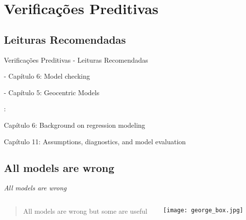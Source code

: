 \section{Verificações Preditivas}

\subsection{Leituras Recomendadas}
\begin{frame}{Verificações Preditivas - Leituras Recomendadas}
	\begin{vfilleditems}
		\item \textcite{gelman2013bayesian} - Capítulo 6: Model checking
		\item \textcite{mcelreath2020statistical} - Capítulo 5: Geocentric Models
		\item \textcite{gelman2020regression}:
		\begin{vfilleditems}
			\item Capítulo 6: Background on regression modeling
			\item Capítulo 11: Assumptions, diagnostics, and model evaluation
		\end{vfilleditems}
		\item \textcite{gelmanBayesianWorkflow2020}
	\end{vfilleditems}
\end{frame}

\subsection{All models are wrong}
\begin{frame}{\textit{All models are wrong}}
	\begin{columns}
		\begin{column}{0.8\textwidth}
			\begin{quotation}
				All models are wrong but some are useful
			\end{quotation}
			\vfill
			\textcite{boxScienceStatistics1976}
		\end{column}
		\begin{column}{0.2\textwidth}
			\texttt{[image: george\_box.jpg]}
		\end{column}
	\end{columns}
\end{frame}

